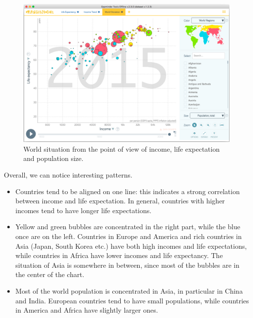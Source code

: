 \begin{figure}[h]
	\centering
	\includegraphics[width=0.95\columnwidth]{figures/world-situation}
	\caption{World situation from the point of view of income, life expectation and population size.}
	\label{fig:world-situation}
\end{figure}

Overall, we can notice interesting patterns.
\begin{itemize}
	\item Countries tend to be aligned on one line: this indicates a strong correlation between income and life expectation. In general, countries with higher incomes tend to have longer life expectations.
	\item Yellow and green bubbles are concentrated in the right part, while the blue once are on the left. Countries in Europe and America and rich countries in Asia (Japan, South Korea etc.) have both high incomes and life expectations, while countries in Africa have lower incomes and life expectancy. The situation of Asia is somewhere in between, since most of the bubbles are in the center of the chart.
	\item Most of the world population is concentrated in Asia, in particular in China and India. European countries tend to have small populations, while countries in America and Africa have slightly larger ones.
\end{itemize}
